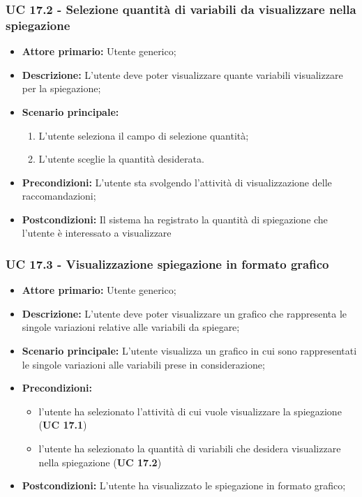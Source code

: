 \subsubsection{UC 17.2 - Selezione quantità di variabili da visualizzare nella spiegazione}
\begin{itemize}
	\item \textbf{Attore primario:} Utente generico;
	\item \textbf{Descrizione:} L'utente deve poter visualizzare quante variabili visualizzare per la spiegazione;
	\item \textbf{Scenario principale:}
	\begin{enumerate}
			\item L'utente seleziona il campo di selezione quantità;
			\item L'utente sceglie la quantità desiderata.
		\end{enumerate}
	
	\item \textbf{Precondizioni:} L'utente sta svolgendo l'attività di visualizzazione delle raccomandazioni;
	\item \textbf{Postcondizioni:} Il sistema ha registrato la quantità di spiegazione che l'utente è interessato a visualizzare
\end{itemize}

\subsubsection{UC 17.3 - Visualizzazione spiegazione in formato grafico}
\begin{itemize}
	\item \textbf{Attore primario:} Utente generico;
	\item \textbf{Descrizione:} L'utente deve poter visualizzare un grafico che rappresenta le singole variazioni relative alle variabili da spiegare;
	\item \textbf{Scenario principale:} L'utente visualizza un grafico in cui sono rappresentati le singole variazioni alle variabili prese in considerazione;
	
	\item \textbf{Precondizioni:}
	\begin{itemize}
			\item l'utente ha selezionato l'attività di cui vuole visualizzare la spiegazione (\textbf{UC 17.1}) 
	 		\item l'utente ha selezionato la quantità di variabili che desidera visualizzare nella spiegazione 	(\textbf{UC 17.2})
	 	\end{itemize}
	\item \textbf{Postcondizioni:} L'utente ha visualizzato le spiegazione in formato grafico;
\end{itemize}


